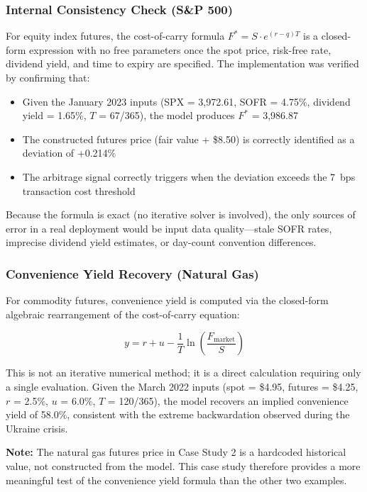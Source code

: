 \documentclass[12pt,a4paper]{article}
\begin{document}
\subsubsection{Internal Consistency Check (S\&P 500)}

For equity index futures, the cost-of-carry formula $F^* = S \cdot e^{(r-q)T}$ is a closed-form expression with no free parameters once the spot price, risk-free rate, dividend yield, and time to expiry are specified. The implementation was verified by confirming that:

\begin{itemize}
    \item Given the January 2023 inputs (SPX = 3,972.61, SOFR = 4.75\%, dividend yield = 1.65\%, $T$ = 67/365), the model produces $F^*$ = 3,986.87
    \item The constructed futures price (fair value + \$8.50) is correctly identified as a deviation of +0.214\%
    \item The arbitrage signal correctly triggers when the deviation exceeds the 7~bps transaction cost threshold
\end{itemize}

Because the formula is exact (no iterative solver is involved), the only sources of error in a real deployment would be input data quality---stale SOFR rates, imprecise dividend yield estimates, or day-count convention differences.

\subsubsection{Convenience Yield Recovery (Natural Gas)}

For commodity futures, convenience yield is computed via the closed-form algebraic rearrangement of the cost-of-carry equation:

\begin{equation}
y = r + u - \frac{1}{T} \ln\!\left(\frac{F_{\text{market}}}{S}\right)
\end{equation}

This is not an iterative numerical method; it is a direct calculation requiring only a single evaluation. Given the March 2022 inputs (spot = \$4.95, futures = \$4.25, $r$ = 2.5\%, $u$ = 6.0\%, $T$ = 120/365), the model recovers an implied convenience yield of 58.0\%, consistent with the extreme backwardation observed during the Ukraine crisis.

\textbf{Note:} The natural gas futures price in Case Study 2 is a hardcoded historical value, not constructed from the model. This case study therefore provides a more meaningful test of the convenience yield formula than the other two examples.
\end{document}
